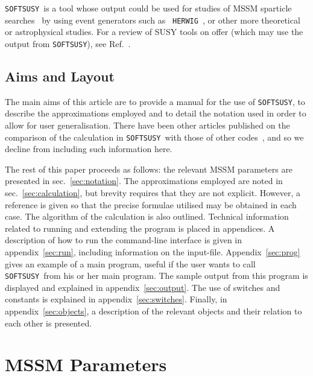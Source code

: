 \documentclass{article}
\def\SOFTSUSY{{\tt SOFTSUSY}}
\begin{document}
\SOFTSUSY~is
a tool whose output could be used for studies of MSSM sparticle
searches~\cite{Allanach:2000ii} by using event generators such as {\tt
  HERWIG}~\cite{Corcella:2000bw}, or other more theoretical or astrophysical
studies. 
For a review of SUSY tools on offer (which may use the output from \SOFTSUSY),
see 
Ref.~\cite{Allanach:2008zn}. 

\subsection{Aims and Layout}

The main aims of this article are to provide a manual for the use of \SOFTSUSY,
to describe the approximations employed and to detail the notation used in
order to
allow for user generalisation. There have been other articles published on the
comparison of the calculation in \SOFTSUSY~with those of other
codes~\cite{comparison}, and so we decline from including such
information here.

The rest of this paper proceeds as follows: 
the relevant MSSM parameters are presented in
sec.~\ref{sec:notation}. The approximations employed are noted in
sec.~\ref{sec:calculation}, but brevity requires that they are not
explicit. However, a reference is given so that the precise formulae utilised
may be obtained in each case. The algorithm of the calculation is also
outlined.
Technical information related to running and extending the program is
placed in appendices.
A description of how to run the command-line interface is given in
appendix~\ref{sec:run}, including information on the input-file.
Appendix~\ref{sec:prog} gives an
example of a main program, useful if the user wants to
call \SOFTSUSY~from his or her main program.
The sample output from this program is displayed and explained in
appendix~\ref{sec:output}. 
The use of switches and constants is explained
in appendix~\ref{sec:switches}. Finally, in appendix~\ref{sec:objects}, 
a description of the relevant objects and their relation to each other is
presented. 

\section{MSSM Parameters \label{sec:notation}}
\end{document}
